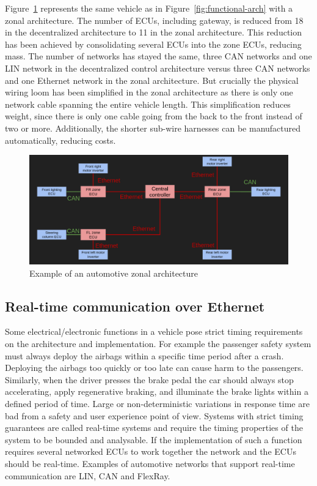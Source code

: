 Figure~\ref{fig:zonal-arch} represents the same vehicle as in Figure~\ref{fig:functional-arch} with a zonal architecture. The number of ECUs, including gateway, is reduced from 18 in the decentralized architecture to 11 in the zonal architecture. This reduction has been achieved by consolidating several ECUs into the zone ECUs, reducing mass. The number of networks has stayed the same, three CAN networks and one LIN network in the decentralized control architecture versus three CAN networks and one Ethernet network in the zonal architecture. But crucially the physical wiring loom has been simplified in the zonal architecture as there is only one network cable spanning the entire vehicle length. This simplification reduces weight, since there is only one cable going from the back to the front instead of two or more. Additionally, the shorter sub-wire harnesses can be manufactured automatically, reducing costs.

\begin{figure}[htb]
    \centering
    \includegraphics[width=\textwidth]{images/zone-arch.png}
    \caption{Example of an automotive zonal architecture}
    \label{fig:zonal-arch}
\end{figure}
\clearpage
\subsection{Real-time communication over Ethernet}
\label{sec:domain_ethernet}
Some electrical/electronic functions in a vehicle pose strict timing requirements on the architecture and implementation. For example the passenger safety system must always deploy the airbags within a specific time period after a crash. Deploying the airbags too quickly or too late can cause harm to the passengers. Similarly, when the driver presses the brake pedal the car should always stop accelerating, apply regenerative braking, and illuminate the brake lights within a defined period of time. Large or non-deterministic variations in response time are bad from a safety and user experience point of view. Systems with strict timing guarantees are called real-time systems and require the timing properties of the system to be bounded and analysable. If the implementation of such a function requires several networked ECUs to work together the network and the ECUs should be real-time. Examples of automotive networks that support real-time communication are LIN, CAN and FlexRay. 

